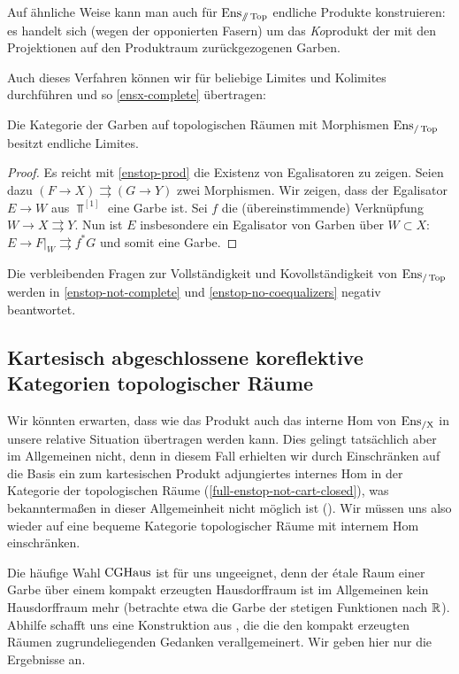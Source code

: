 \begin{bem}
  Auf ähnliche Weise kann man auch für $\operatorname{Ens}_{\mathbin{/\mkern-6mu/} \operatorname{Top}}$ endliche
  Produkte konstruieren: es handelt sich (wegen der opponierten
  Fasern) um das \emph{Ko}produkt der mit den Projektionen auf den
  Produktraum zurückgezogenen Garben.
\end{bem}
Auch dieses Verfahren können wir für beliebige Limites und Kolimites
durchführen und so \ref{ensx-complete} übertragen:
\begin{satz} \label{enstop-fin-complete}
  Die Kategorie der Garben auf topologischen Räumen mit Morphismen
  $\operatorname{Ens}_{/\operatorname{Top}}$ besitzt endliche Limites.
\end{satz}
\begin{proof}
  Es reicht mit \ref{enstop-prod} die Existenz von Egalisatoren zu
  zeigen. Seien dazu $(F \to X) \rightrightarrows (G \to Y)$ zwei
  Morphismen. Wir zeigen, dass der Egalisator $E \to W$ aus
  $\Top^{[1]}$ eine Garbe ist. Sei $f$ die (übereinstimmende)
  Verknüpfung $W \to X \rightrightarrows Y$. Nun ist $E$ insbesondere
  ein Egalisator von Garben über $W \subset X$: $E \to F|_W
  \rightrightarrows f^* G$ und somit eine Garbe.
\end{proof}
\begin{bem}
  Die verbleibenden Fragen zur Vollständigkeit und Kovollständigkeit
  von $\operatorname{Ens}_{/\operatorname{Top}}$ werden in \ref{enstop-not-complete} und
  \ref{enstop-no-coequalizers} negativ beantwortet.
\end{bem}

\subsection{Kartesisch abgeschlossene koreflektive Kategorien topologischer Räume}

Wir könnten erwarten, dass wie das Produkt auch das interne Hom von
$\operatorname{Ens_{/X}}$ in unsere relative Situation übertragen werden kann. Dies
gelingt tatsächlich aber im Allgemeinen nicht, denn in diesem Fall
erhielten wir durch Einschränken auf die Basis ein zum kartesischen
Produkt adjungiertes internes Hom in der Kategorie der topologischen
Räume (\ref{full-enstop-not-cart-closed}), was bekanntermaßen in
dieser Allgemeinheit nicht möglich ist (\cite{Borceux???}). Wir müssen
uns also wieder auf eine bequeme Kategorie topologischer Räume mit
internem Hom einschränken.

Die häufige Wahl $\operatorname{CGHaus}$ ist für uns ungeeignet, denn der étale Raum
einer Garbe über einem kompakt erzeugten Hausdorffraum ist im
Allgemeinen kein Hausdorffraum mehr (betrachte etwa die Garbe der
stetigen Funktionen nach $\mathbb{R}$). Abhilfe schafft uns eine Konstruktion
aus \cite{Vogt}, die die den kompakt erzeugten Räumen
zugrundeliegenden Gedanken verallgemeinert. Wir geben hier nur die
Ergebnisse an.

